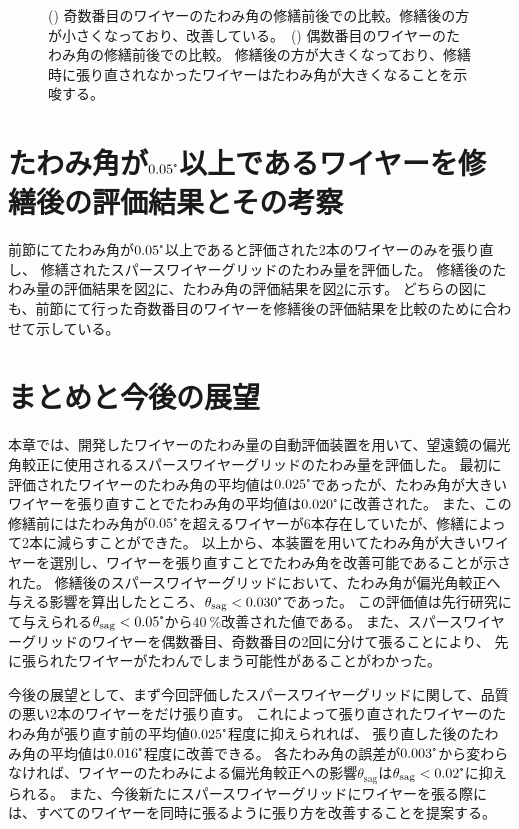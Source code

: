 \documentclass[../../main.tex]{subfiles}
\begin{document}
\begin{figure}[H]
\begin{minipage}[b]{0.5\hsize}
        \subcaption{}
        \label{fig:wiresag_swg_sag_even_comparison}
    \end{minipage}
    \caption{() 奇数番目のワイヤーのたわみ角の修繕前後での比較。修繕後の方が小さくなっており、改善している。\ 
             () 偶数番目のワイヤーのたわみ角の修繕前後での比較。
             修繕後の方が大きくなっており、修繕時に張り直されなかったワイヤーはたわみ角が大きくなることを示唆する。
             }
    \label{fig:wiresag_swg_even_odd_repair_comparison}
\end{figure}

\section{たわみ角が$0.05\tcdegree$以上であるワイヤーを修繕後の評価結果とその考察}
前節にてたわみ角が$0.05\tcdegree$以上であると評価された2本のワイヤーのみを張り直し、
修繕されたスパースワイヤーグリッドのたわみ量を評価した。
修繕後のたわみ量の評価結果を図\ref{}に、たわみ角の評価結果を図\ref{}に示す。
どちらの図にも、前節にて行った奇数番目のワイヤーを修繕後の評価結果を比較のために合わせて示している。




\section{まとめと今後の展望}
本章では、開発したワイヤーのたわみ量の自動評価装置を用いて、望遠鏡の偏光角較正に使用されるスパースワイヤーグリッドのたわみ量を評価した。
最初に評価されたワイヤーのたわみ角の平均値は$0.025\tcdegree$であったが、たわみ角が大きいワイヤーを張り直すことでたわみ角の平均値は$0.020\tcdegree$に改善された。
また、この修繕前にはたわみ角が$0.05\tcdegree$を超えるワイヤーが6本存在していたが、修繕によって2本に減らすことができた。
以上から、本装置を用いてたわみ角が大きいワイヤーを選別し、ワイヤーを張り直すことでたわみ角を改善可能であることが示された。
修繕後のスパースワイヤーグリッドにおいて、たわみ角が偏光角較正へ与える影響を算出したところ、$\theta_{\mathrm{sag}}<0.030\tcdegree$であった。
この評価値は先行研究にて与えられる$\theta_{\mathrm{sag}}<0.05\tcdegree$から$\SI{40}{\%}$改善された値である。
また、スパースワイヤーグリッドのワイヤーを偶数番目、奇数番目の2回に分けて張ることにより、
先に張られたワイヤーがたわんでしまう可能性があることがわかった。

今後の展望として、まず今回評価したスパースワイヤーグリッドに関して、品質の悪い2本のワイヤーをだけ張り直す。
これによって張り直されたワイヤーのたわみ角が張り直す前の平均値$0.025\tcdegree$程度に抑えられれば、
張り直した後のたわみ角の平均値は$0.016\tcdegree$程度に改善できる。
各たわみ角の誤差が$0.003\tcdegree$から変わらなければ、ワイヤーのたわみによる偏光角較正への影響$\theta_{\mathrm{sag}}$は$\theta_{\mathrm{sag}}<0.02\tcdegree$に抑えられる。
また、今後新たにスパースワイヤーグリッドにワイヤーを張る際には、すべてのワイヤーを同時に張るように張り方を改善することを提案する。
\end{document}
